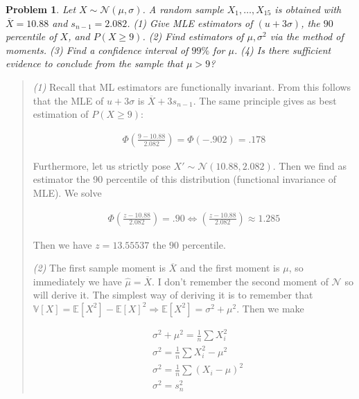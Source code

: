\documentclass[a4paper, 12pt]{article}
\newtheorem{problem}{Problem}
\newtheorem{problem}{Problem}
\begin{document}
\pagebreak

\begin{problem}
    Let $X \sim \mathcal{N}(\mu, \sigma )$. A random sample $X_1, \ldots,
    X_{15}$ is obtained with $\overline{X} = 10.88$ and $s_{n-1} = 2.082$.
    \textit{(1)} Give MLE estimators of $(u + 3 \sigma)$, the $90$ percentile
    of $X$, and $P(X \geq 9)$. \textit{(2)} Find estimators of $\mu, \sigma^2$
    via the method of moments. \textit{(3)} Find a confidence interval of $99\%$
    for $\mu$. \textit{(4)} Is there sufficient evidence to conclude from the
    sample that $\mu > 9$?
\end{problem}


\small
\begin{quote}

\textit{(1)} Recall that ML estimators are functionally invariant. From this
follows that the MLE of $u + 3\sigma$ is $\overline{X} + 3 s_{n-1}$. The same
principle gives as best estimation of $P(X \geq 9)$:

\begin{align*}
    \Phi \left( \frac{9 - 10.88}{2.082} \right) =
    \Phi(-.902) = .178
\end{align*}

Furthermore, let us strictly pose $X' \sim \mathcal{N}(10.88, 2.082)$. Then we
find as estimator the 90 percentile of this distribution (functional invariance
of MLE). We solve

\begin{align*}
    \Phi\left( \frac{z - 10.88}{2.082} \right) = .90 \iff \left( \frac{z -
    10.88}{2.082} \right) \approx 1.285
\end{align*}

Then we have $z = 13.55537$ the $90$ percentile.


\textit{(2)} The first sample moment is $\overline{X}$ and the first moment is
$\mu$, so immediately we have $\hat{\mu} = \overline{X}$. I don't remember the
second moment of $\mathcal{N}$ so will derive it. The simplest way of deriving
it is to remember that $\mathbb{V}\left[ X \right] = \mathbb{E}\left[ X^2
\right] - \mathbb{E}\left[ X \right]^2 \Rightarrow \mathbb{E}\left[ X^2 \right]=
\sigma^2 + \mu^2$. Then we make 

\begin{align*}
    &\sigma^2 + \mu^2 = \frac{1}{n} \sum X_i^2 \\ 
    &\sigma^2 = \frac{1}{n} \sum X_i^2 - \mu^2 \\ 
    &\sigma^2 =  \frac{1}{n} \sum (X_i - \mu)^2 \\ 
    &\sigma^2 = s_n^2
\end{align*}



\end{quote}
\end{document}

